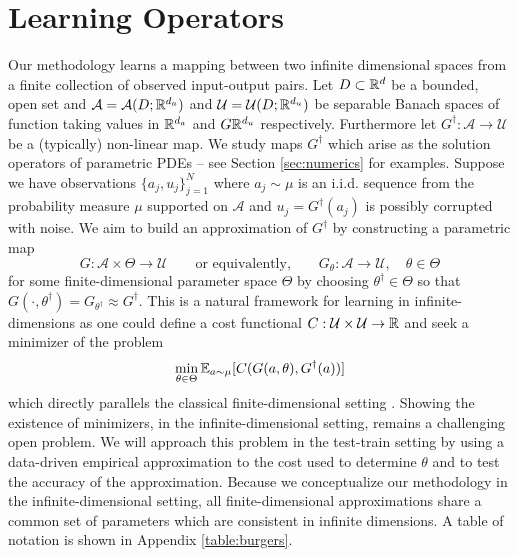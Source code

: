 \documentclass{article} %
\newcommand{\A}{\mathcal{A}}
\newcommand{\U}{\mathcal{U}}
\newcommand{\Ftrue}{G^\dagger}
\newcommand{\F}{{G}}
\begin{document}
\section{Learning Operators}
\label{sec:operator}
Our methodology learns a mapping between two infinite dimensional spaces from a finite
collection of observed input-output pairs. Let  $D \subset \mathbb{R}^d$ be a bounded, open set and \(\A = \A(D;\R^{d_a})\) and \(\U= \U(D;\R^{d_u})\) be separable Banach spaces of function taking values in \(\mathbb{R}^{d_a}\) and \(G\mathbb{R}^{d_u}\) respectively. Furthermore let \(\Ftrue : \A \to \U\) be a (typically) non-linear map. We study maps \(\Ftrue\) which arise as the solution operators of parametric PDEs -- see Section \ref{sec:numerics} for examples. Suppose we have observations \(\{a_j, u_j\}_{j=1}^N\) where 
\(a_j \sim \mu\) is an i.i.d. sequence from the probability measure \(\mu\) supported on 
\(\A\) and \(u_j = \Ftrue(a_j)\) is possibly corrupted with noise. We aim to build an approximation of \(\Ftrue\) by 
constructing a parametric map 
\begin{equation}
\label{eq:approxmap}
\F : \A \times \Theta \to \U
\qquad
\text{or equivalently,}
\qquad
\F_{\theta} : \A \to \U, \quad \theta \in \Theta
\end{equation}
for some finite-dimensional parameter space \(\Theta\) by choosing
\(\theta^\dagger \in \Theta\) so that \(\F(\cdot, \theta^\dagger) = \F_{\theta^\dagger} \approx \Ftrue\).
This is a natural framework for learning in infinite-dimensions as one could define a cost functional \(C : \U \times \U \to \R\) and seek a minimizer of the problem
\[\min_{\theta \in \Theta} \E_{a \sim \mu} [C(\F(a,\theta), \Ftrue(a))]\]
which directly parallels the classical finite-dimensional 
setting \citep{Vapnik1998}. Showing the existence of minimizers, in the infinite-dimensional setting, remains a challenging open problem. We will approach this problem in the test-train setting by using a data-driven
empirical approximation to the cost used to determine
$\theta$ and to test the accuracy of the approximation.
Because we conceptualize our methodology in the infinite-dimensional setting, all finite-dimensional approximations share a common set of parameters which are consistent in infinite dimensions. 
A table of notation is shown in Appendix \ref{table:burgers}.
\end{document}
